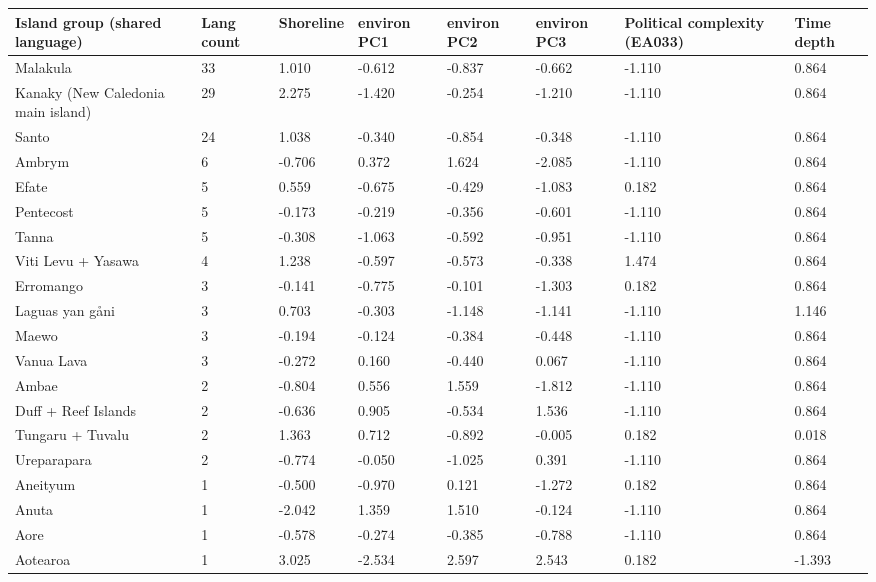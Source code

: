 \begin{longtable}{p{4.5cm}p{1.4cm}p{1.4cm}p{1.4cm}p{1.7cm}p{1.7cm}p{1.7cm}p{1.7cm}}
  \toprule
Island group (shared language) & Lang count & Shoreline & environ PC1 & environ PC2 & environ PC3 & Political complexity (EA033) & Time depth \\ 
  \midrule
Malakula & 33 & 1.010 & -0.612 & -0.837 & -0.662 & -1.110 & 0.864 \\ 
  Kanaky (New Caledonia main island) & 29 & 2.275 & -1.420 & -0.254 & -1.210 & -1.110 & 0.864 \\ 
  Santo & 24 & 1.038 & -0.340 & -0.854 & -0.348 & -1.110 & 0.864 \\ 
  Ambrym & 6 & -0.706 & 0.372 & 1.624 & -2.085 & -1.110 & 0.864 \\ 
  Efate & 5 & 0.559 & -0.675 & -0.429 & -1.083 & 0.182 & 0.864 \\ 
  Pentecost & 5 & -0.173 & -0.219 & -0.356 & -0.601 & -1.110 & 0.864 \\ 
  Tanna & 5 & -0.308 & -1.063 & -0.592 & -0.951 & -1.110 & 0.864 \\ 
  Viti Levu + Yasawa & 4 & 1.238 & -0.597 & -0.573 & -0.338 & 1.474 & 0.864 \\ 
  Erromango & 3 & -0.141 & -0.775 & -0.101 & -1.303 & 0.182 & 0.864 \\ 
  Laguas yan gåni & 3 & 0.703 & -0.303 & -1.148 & -1.141 & -1.110 & 1.146 \\ 
  Maewo & 3 & -0.194 & -0.124 & -0.384 & -0.448 & -1.110 & 0.864 \\ 
  Vanua Lava & 3 & -0.272 & 0.160 & -0.440 & 0.067 & -1.110 & 0.864 \\ 
  Ambae & 2 & -0.804 & 0.556 & 1.559 & -1.812 & -1.110 & 0.864 \\ 
  Duff + Reef Islands & 2 & -0.636 & 0.905 & -0.534 & 1.536 & -1.110 & 0.864 \\ 
  Tungaru + Tuvalu & 2 & 1.363 & 0.712 & -0.892 & -0.005 & 0.182 & 0.018 \\ 
  Ureparapara & 2 & -0.774 & -0.050 & -1.025 & 0.391 & -1.110 & 0.864 \\ 
  Aneityum & 1 & -0.500 & -0.970 & 0.121 & -1.272 & 0.182 & 0.864 \\ 
  Anuta & 1 & -2.042 & 1.359 & 1.510 & -0.124 & -1.110 & 0.864 \\ 
  Aore & 1 & -0.578 & -0.274 & -0.385 & -0.788 & -1.110 & 0.864 \\ 
  Aotearoa & 1 & 3.025 & -2.534 & 2.597 & 2.543 & 0.182 & -1.393 \\ 

\end{longtable}
